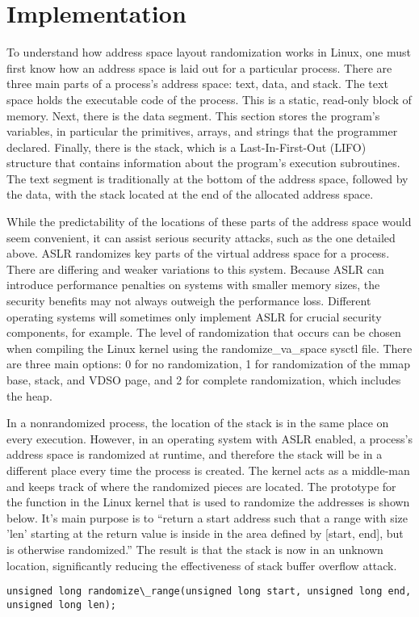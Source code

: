\section{Implementation}
\label{s:implementation} %

To understand how address space layout randomization works in Linux, one must first know how an address space is laid out for a particular process. There are three main parts of a process’s address space: text, data, and stack. The text space holds the executable code of the process. This is a static, read-only block of memory. Next, there is the data segment. This section stores the program’s variables, in particular the primitives, arrays, and strings that the programmer declared. Finally, there is the stack, which is a Last-In-First-Out (LIFO) structure that contains information about the program’s execution subroutines. The text segment is traditionally at the bottom of the address space, followed by the data, with the stack located at the end of the allocated address space.

While the predictability of the locations of these parts of the address space would seem convenient, it can assist serious security attacks, such as the one detailed above. ASLR randomizes key parts of the virtual address space for a process. There are differing and weaker variations to this system. Because ASLR can introduce performance penalties on systems with smaller memory sizes, the security benefits may not always outweigh the performance loss. Different operating systems will sometimes only implement ASLR for crucial security components, for example. The level of randomization that occurs can be chosen when compiling the Linux kernel using the randomize\_va\_space sysctl file. There are three main options: 0 for no randomization, 1 for randomization of the mmap base, stack, and VDSO page, and 2 for complete randomization, which includes the heap. \cite{kerneldocs}

In a nonrandomized process, the location of the stack is in the same place on every execution. However, in an operating system with ASLR enabled, a process’s address space is randomized at runtime, and therefore the stack will be in a different place every time the process is created. The kernel acts as a middle-man and keeps track of where the randomized pieces are located. The prototype for the function in the Linux kernel that is used to randomize the addresses is shown below. It’s main purpose is to “return a start address such that a \<range\> with size 'len' starting at the return value is inside in the area defined by [start, end], but is otherwise randomized.” \cite{randomc} The result is that the stack is now in an unknown location, significantly reducing the effectiveness of stack buffer overflow attack.

\begin{lstlisting}[caption=Figure 2. Prototype for randomize_range]
unsigned long randomize\_range(unsigned long start, unsigned long end, unsigned long len);
\end{lstlisting}
